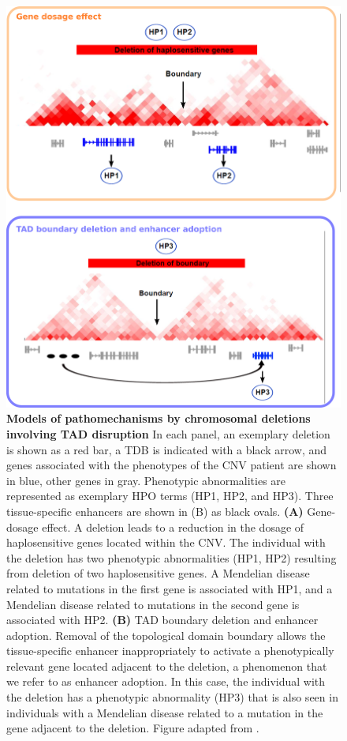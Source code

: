 \documentclass[a4paper,twoside=true,openright,parskip=full,chapterprefix=true,11pt,headings=normal,bibliography=totoc,listof=totoc,titlepage=on,captions=tableabove,draft=false]{scrreprt}
\theoremstyle{definition}
\theoremstyle{definition}
\theoremstyle{definition}
\theoremstyle{remark}
\begin{document}
\begin{figure}

{\centering \includegraphics[width=0.6\linewidth]{figures/GDE_vs_TDBD_v03} 

}

\caption{\textbf{Models of pathomechanisms by
chromosomal deletions involving TAD disruption} In each panel, an
exemplary deletion is shown as a red bar, a TDB is indicated with a
black arrow, and genes associated with the phenotypes of the CNV patient
are shown in blue, other genes in gray. Phenotypic abnormalities are
represented as exemplary HPO terms (HP1, HP2, and HP3). Three
tissue-specific enhancers are shown in (B) as black ovals. \textbf{(A)}
Gene-dosage effect. A deletion leads to a reduction in the dosage of
haplosensitive genes located within the CNV. The individual with the
deletion has two phenotypic abnormalities (HP1, HP2) resulting from
deletion of two haplosensitive genes. A Mendelian disease related to
mutations in the first gene is associated with HP1, and a Mendelian
disease related to mutations in the second gene is associated with HP2.
\textbf{(B)} TAD boundary deletion and enhancer adoption. Removal of the
topological domain boundary allows the tissue-specific enhancer
inappropriately to activate a phenotypically relevant gene located
adjacent to the deletion, a phenomenon that we refer to as enhancer
adoption. In this case, the individual with the deletion has a
phenotypic abnormality (HP3) that is also seen in individuals with a
Mendelian disease related to a mutation in the gene adjacent to the
deletion. Figure adapted from \citep{Ibn-Salem2014}.}\label{fig:EnhancerAdoption}
\end{figure}
\end{document}
